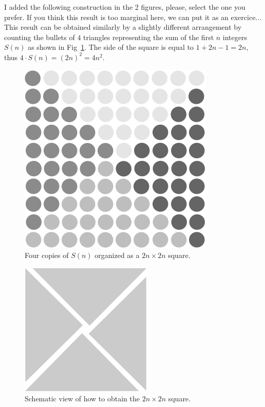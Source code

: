 {\Denis I added the following construction in the 2 figures, please, select the one you prefer.
If you think this result is too marginal here, we can put it as an exercice...}
This result can be obtained similarly by a slightly different arrangement by counting the bullets
of $4$ triangles representing the sum of the first $n$ integers $S(n)$ as shown in Fig~\ref{fig:alternateSumOdds}.
The side of the square is equal to $1+2n-1=2n$, thus $4 \cdot S(n)=(2n)^2= 4n^2$.
\begin{figure}[ht]
\begin{center}
       \includegraphics[scale=0.4]{FiguresMaths/Deltaodd}
\caption{Four copies of $S(n)$ organized as a $2n \times 2n$ square.}
       \label{fig:alternateSumOdds}
\end{center}
\end{figure}
\begin{figure}[ht]
\begin{center}
       \includegraphics[scale=0.4]{FiguresMaths/DeltaoddSynthetic}
\caption{Schematic view of how to obtain the $2n \times 2n$ square.}
       \label{fig:alternateSumOdds2}
\end{center}
\end{figure}


